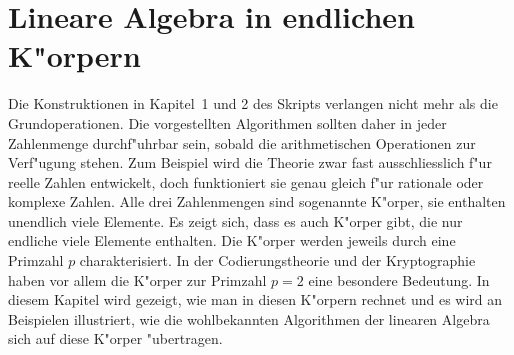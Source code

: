 %
%
%
\chapter{Lineare Algebra in endlichen K"orpern}

Die Konstruktionen in Kapitel~1 und 2 des Skripts verlangen nicht mehr
als die Grundoperationen.
Die vorgestellten Algorithmen sollten daher in jeder Zahlenmenge
durchf"uhrbar sein, sobald die arithmetischen Operationen zur
Verf"ugung stehen.
Zum Beispiel wird die Theorie zwar fast ausschliesslich f"ur reelle
Zahlen entwickelt, doch funktioniert sie genau gleich f"ur rationale
oder komplexe Zahlen.
Alle drei Zahlenmengen sind sogenannte K"orper, sie enthalten
unendlich viele Elemente.
Es zeigt sich, dass es auch K"orper gibt, die nur endliche viele
Elemente enthalten.
Die K"orper werden jeweils durch eine Primzahl $p$ charakterisiert.
In der Codierungstheorie und der Kryptographie haben vor allem die
K"orper zur Primzahl $p=2$ eine besondere Bedeutung.
In diesem Kapitel wird gezeigt, wie man in diesen K"orpern rechnet
und es wird an Beispielen illustriert, wie die wohlbekannten Algorithmen
der linearen Algebra sich auf diese K"orper "ubertragen.






